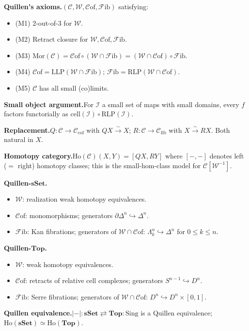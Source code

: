\begin{formalrestatement}
\textbf{Quillen's axioms.}\quad $(\mathcal{C}, \mathcal{W}, \mathcal{C}\mathrm{of},
\mathcal{F}\mathrm{ib})$ satisfying:
\begin{itemize}
  \item (M1) $2$-out-of-$3$ for $\mathcal{W}$.
  \item (M2) Retract closure for $\mathcal{W}, \mathcal{C}\mathrm{of}, \mathcal{F}\mathrm{ib}$.
  \item (M3) $\mathrm{Mor}(\mathcal{C}) = \mathcal{C}\mathrm{of} \circ (\mathcal{W} \cap \mathcal{F}\mathrm{ib}) = (\mathcal{W} \cap \mathcal{C}\mathrm{of}) \circ \mathcal{F}\mathrm{ib}$.
  \item (M4) $\mathcal{C}\mathrm{of} = \mathrm{LLP}(\mathcal{W} \cap \mathcal{F}\mathrm{ib})$; $\mathcal{F}\mathrm{ib} = \mathrm{RLP}(\mathcal{W} \cap \mathcal{C}\mathrm{of})$.
  \item (M5) $\mathcal{C}$ has all small (co)limits.
\end{itemize}

\medskip
\textbf{Small object argument.}\quad For $\mathcal{I}$ a small set of maps with
small domains, every $f$ factors functorially as $\mathrm{cell}(\mathcal{I})
\circ \mathrm{RLP}(\mathcal{I})$.

\medskip
\textbf{Replacement.}\quad $Q : \mathcal{C} \to \mathcal{C}_{\mathrm{cof}}$
with $QX \xrightarrow{\sim} X$; $R : \mathcal{C} \to \mathcal{C}_{\mathrm{fib}}$
with $X \xrightarrow{\sim} RX$. Both natural in $X$.

\medskip
\textbf{Homotopy category.}\quad $\mathrm{Ho}(\mathcal{C})(X, Y) = [QX, RY]$
where $[-,-]$ denotes left ($=$ right) homotopy classes; this is the
small-hom-class model for $\mathcal{C}[\mathcal{W}^{-1}]$.

\medskip
\textbf{Quillen-$\mathbf{sSet}$.}\quad
\begin{itemize}
  \item $\mathcal{W}$: realization weak homotopy equivalences.
  \item $\mathcal{C}\mathrm{of}$: monomorphisms; generators
        $\partial\Delta^n \hookrightarrow \Delta^n$.
  \item $\mathcal{F}\mathrm{ib}$: Kan fibrations; generators of
        $\mathcal{W} \cap \mathcal{C}\mathrm{of}$:
        $\Lambda^n_k \hookrightarrow \Delta^n$ for $0 \leq k \leq n$.
\end{itemize}

\medskip
\textbf{Quillen-$\mathbf{Top}$.}\quad
\begin{itemize}
  \item $\mathcal{W}$: weak homotopy equivalences.
  \item $\mathcal{C}\mathrm{of}$: retracts of relative cell complexes;
        generators $S^{n-1} \hookrightarrow D^n$.
  \item $\mathcal{F}\mathrm{ib}$: Serre fibrations; generators of
        $\mathcal{W} \cap \mathcal{C}\mathrm{of}$:
        $D^n \hookrightarrow D^n \times [0, 1]$.
\end{itemize}

\medskip
\textbf{Quillen equivalence.}\quad $\lvert{-}\rvert : \mathbf{sSet}
\rightleftarrows \mathbf{Top} : \mathrm{Sing}$ is a Quillen equivalence;
$\mathrm{Ho}(\mathbf{sSet}) \simeq \mathrm{Ho}(\mathbf{Top})$.
\end{formalrestatement}

